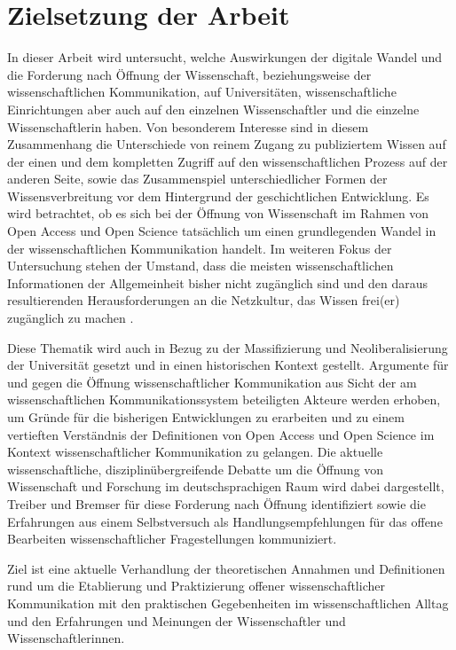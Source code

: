 \section{Zielsetzung der Arbeit}

In dieser Arbeit wird untersucht, welche Auswirkungen der digitale Wandel und die Forderung nach Öffnung der Wissenschaft, beziehungsweise der wissenschaftlichen Kommunikation, auf Universitäten, wissenschaftliche Einrichtungen aber auch auf den einzelnen Wissenschaftler und die einzelne Wissenschaftlerin haben. Von besonderem Interesse sind in diesem Zusammenhang die Unterschiede von reinem Zugang zu publiziertem Wissen auf der einen und dem kompletten Zugriff auf den wissenschaftlichen Prozess auf der anderen Seite, sowie das Zusammenspiel unterschiedlicher Formen der Wissensverbreitung vor dem Hintergrund der geschichtlichen Entwicklung. Es wird betrachtet, ob es sich bei der Öffnung von Wissenschaft im Rahmen von Open Access und Open Science tatsächlich um einen grundlegenden Wandel in der wissenschaftlichen Kommunikation handelt. Im weiteren Fokus der Untersuchung stehen der Umstand, dass die meisten wissenschaftlichen Informationen der Allgemeinheit bisher nicht zugänglich sind und den daraus resultierenden Herausforderungen an die Netzkultur, das Wissen frei(er) zugänglich zu machen \cite{cite:6}.

Diese Thematik wird auch in Bezug zu der Massifizierung und Neoliberalisierung der Universität gesetzt und in einen historischen Kontext gestellt. Argumente für und gegen die Öffnung wissenschaftlicher Kommunikation aus Sicht der am wissenschaftlichen Kommunikationssystem beteiligten Akteure werden erhoben, um Gründe für die bisherigen Entwicklungen zu erarbeiten und zu einem vertieften Verständnis der Definitionen von Open Access und Open Science im Kontext wissenschaftlicher Kommunikation zu gelangen. Die aktuelle wissenschaftliche, disziplinübergreifende Debatte um die Öffnung von Wissenschaft und Forschung im deutschsprachigen Raum wird dabei dargestellt, Treiber und Bremser für diese Forderung nach Öffnung identifiziert sowie die Erfahrungen aus einem Selbstversuch als Handlungsempfehlungen für das offene Bearbeiten wissenschaftlicher Fragestellungen kommuniziert.

Ziel ist eine aktuelle Verhandlung der theoretischen Annahmen und Definitionen rund um die Etablierung und Praktizierung offener wissenschaftlicher Kommunikation mit den praktischen Gegebenheiten im wissenschaftlichen Alltag und den Erfahrungen und Meinungen der Wissenschaftler und Wissenschaftlerinnen.

